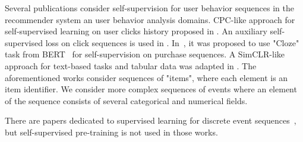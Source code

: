 \documentclass[sigconf, anonymous]{acmart}
\newcommand{\R}{\mathbb{R}}
\newcommand{\GG}[1]{\textcolor{red}{[GG: #1]}}
\begin{document}
Several publications consider self-supervision for user behavior sequences in the recommender system an user behavior analysis domains. CPC-like approach for self-supervised learning on user clicks history proposed in \citep{Zhou2020ContrastiveLF}. An auxiliary self-supervised loss on click sequences is used in \citep{Ma2020DisentangledSI}. 
In~\citep{Zhou2020S3RecSL}, it was proposed to use "Cloze" task from BERT~\citep{Devlin2019BERTPO} for self-supervision on purchase sequences.
A SimCLR-like approach for text-based tasks and tabular data was adapted in \citep{Yao2020SelfsupervisedLF}.
The aforementioned works consider sequences of "items", where each element is an item identifier. We consider more complex sequences of events where an element of the sequence consists of several categorical and numerical fields.

There are papers dedicated to supervised learning for discrete event sequences~\citep{Wiese2009CreditCT, Tobback2019RetailCS, Babaev2019ETRNNAD, chatterjee2003modeling, sinha2014your}, but self-supervised pre-training is not used in those works.


\end{document}
